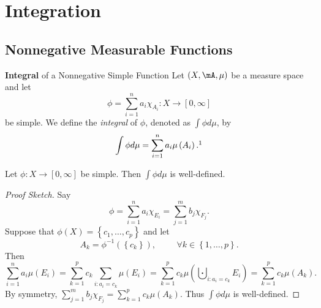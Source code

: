 \documentclass[pmath451]{subfiles}
\begin{document}
    \section{Integration}
    
    \subsection{Nonnegative Measurable Functions}
    
    \begin{definition}{\textbf{Integral} of a Nonnegative Simple Function}
        Let $\left( X,\mA,\mu \right)$ be a measure space and let
        \begin{equation*}
            \phi = \sum^{n}_{i=1}a_i\chi_{A_i}:X\to\left[ 0,\infty \right]
        \end{equation*}
        be simple. We define the \emph{integral} of $\phi$, denoted as $\int\phi d\mu$, by
        \begin{equation*}
            \int\phi d\mu = \sum^{n}_{i=1}a_i\mu\left( A_i \right).\footnotemark[1]
        \end{equation*}
        
        \noindent
        \begin{minipage}{\textwidth}
        \end{minipage}
    \end{definition}
    
    \begin{prop}{}
        Let $\phi:X\to\left[ 0,\infty \right]$ be simple. Then $\int\phi d\mu$ is well-defined.
    \end{prop}
    
    \begin{proof}[Proof Sketch]
        Say
        \begin{equation*}
            \phi = \sum^{n}_{i=1} a_i\chi_{E_i} = \sum^{m}_{j=1} b_j\chi_{F_j}.
        \end{equation*}
        Suppose that $\phi\left( X \right) = \left\lbrace c_1,\ldots,c_p \right\rbrace$ and let
        \begin{equation*}
            A_k = \phi^{-1}\left( \left\lbrace c_k \right\rbrace \right),\hspace{1cm}\forall k\in\left\lbrace 1,\ldots,p \right\rbrace.
        \end{equation*}
        Then
        \begin{equation*}
            \sum^{n}_{i=1} a_i\mu\left( E_i \right) = \sum^{p}_{k=1} c_k \sum^{}_{i:a_i=c_k} \mu\left( E_i \right) = \sum^{p}_{k=1} c_k\mu\left( \bigcupdot^{}_{i:a_i=c_k} E_i \right) = \sum^{p}_{k=1} c_k\mu\left( A_k \right).
        \end{equation*}
        By symmetry, $\sum^{m}_{j=1} b_j\chi_{F_j} = \sum^{p}_{k=1}c_k\mu\left( A_k \right)$. Thus $\int\phi d\mu$ is well-defined.
    \end{proof}
    
\end{document}
